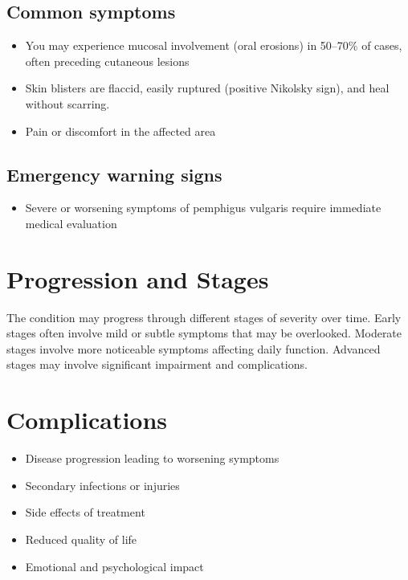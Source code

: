 \subsection{Common symptoms}
\begin{itemize}[noitemsep]
  \item You may experience mucosal involvement (oral erosions) in 50--70\% of cases, often preceding cutaneous lesions
  \item Skin blisters are flaccid, easily ruptured (positive Nikolsky sign), and heal without scarring.
  \item Pain or discomfort in the affected area
  \end{itemize}

\subsection{Emergency warning signs}
\begin{itemize}[noitemsep]
  \item Severe or worsening symptoms of pemphigus vulgaris require immediate medical evaluation
\end{itemize}
\section{Progression and Stages}
The condition may progress through different stages of severity over time. Early stages often involve mild or subtle symptoms that may be overlooked. Moderate stages involve more noticeable symptoms affecting daily function. Advanced stages may involve significant impairment and complications.
\section{Complications}
\begin{itemize}[noitemsep]
  \item Disease progression leading to worsening symptoms
  \item Secondary infections or injuries
  \item Side effects of treatment
  \item Reduced quality of life
  \item Emotional and psychological impact
\end{itemize}
